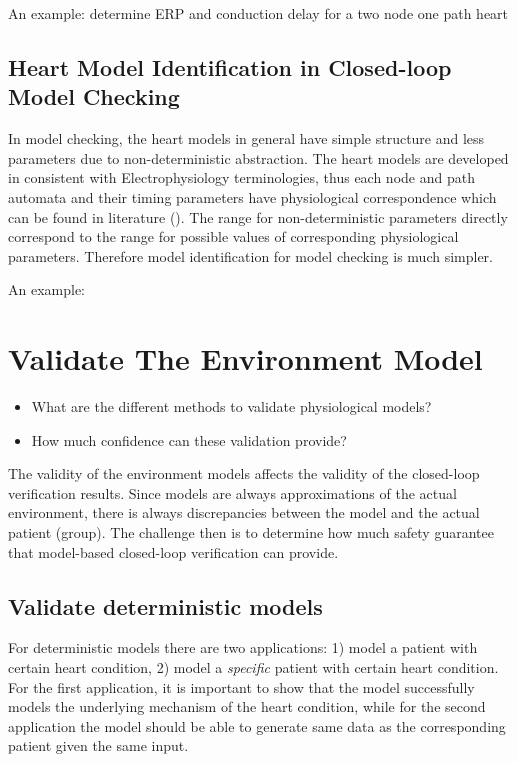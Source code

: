 An example: determine ERP and conduction delay for a two node one path heart
\section{Heart Model Identification in Closed-loop Model Checking}
In model checking, the heart models in general have simple structure and less parameters due to non-deterministic abstraction. The heart models are developed in consistent with Electrophysiology terminologies, thus each node and path automata and their timing parameters have physiological correspondence which can be found in literature (\cite{josephson}). The range for non-deterministic parameters directly correspond to the range for possible values of corresponding physiological parameters. Therefore model identification for model checking is much simpler. 

An example: 







\chapter{Validate The Environment Model}
\begin{itemize}
	\item What are the different methods to validate physiological models?
    \item How much confidence can these validation provide?
\end{itemize}
The validity of the environment models affects the validity of the closed-loop verification results. Since models are always approximations of the actual environment, there is always discrepancies between the model and the actual patient (group). The challenge then is to determine how much safety guarantee that model-based closed-loop verification can provide. 

\section{Validate deterministic models}
For deterministic models there are two applications: 1) model a patient with certain heart condition, 2) model a \emph{specific} patient with certain heart condition. For the first application, it is important to show that the model successfully models the underlying mechanism of the heart condition, while for the second application the model should be able to generate same data as the corresponding patient given the same input. 

